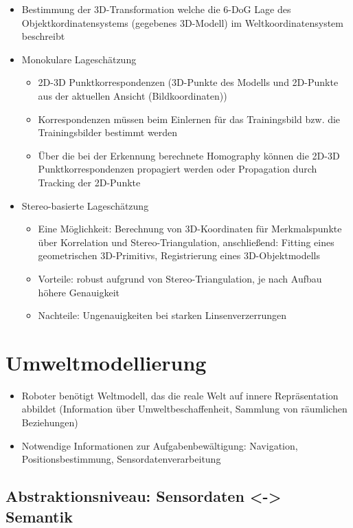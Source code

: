 \documentclass[paper=a4, fontsize=11pt]{scrartcl} %
\numberwithin{equation}{section} %
\numberwithin{figure}{section} %
\numberwithin{table}{section} %
\begin{document}
\begin{itemize}
\item Bestimmung der 3D-Transformation welche die 6-DoG Lage des Objektkordinatensystems (gegebenes 3D-Modell) im Weltkoordinatensystem beschreibt
\item Monokulare Lageschätzung 
\begin{itemize}
\item 2D-3D Punktkorrespondenzen (3D-Punkte des Modells und 2D-Punkte aus der aktuellen Ansicht (Bildkoordinaten))
\item Korrespondenzen müssen beim Einlernen für das Trainingsbild bzw. die Trainingsbilder bestimmt werden
\item Über die bei der Erkennung berechnete Homography können die 2D-3D Punktkorrespondenzen propagiert werden oder Propagation durch Tracking der 2D-Punkte
\end{itemize}
\item Stereo-basierte Lageschätzung
\begin{itemize}
\item Eine Möglichkeit: Berechnung von 3D-Koordinaten für Merkmalspunkte über Korrelation und Stereo-Triangulation, anschließend: Fitting eines geometrischen 3D-Primitivs, Registrierung eines 3D-Objektmodells
\item Vorteile: robust aufgrund von Stereo-Triangulation, je nach Aufbau höhere Genauigkeit
\item Nachteile: Ungenauigkeiten bei starken Linsenverzerrungen
\end{itemize}
\end{itemize}

\section{Umweltmodellierung}

\begin{itemize}
\item Roboter benötigt Weltmodell, das die reale Welt auf innere Repräsentation abbildet (Information über Umweltbeschaffenheit, Sammlung von räumlichen Beziehungen)
\item Notwendige Informationen zur Aufgabenbewältigung: Navigation, Positionsbestimmung, Sensordatenverarbeitung
\end{itemize}

\subsection{Abstraktionsniveau: Sensordaten <-> Semantik}
\end{document}
